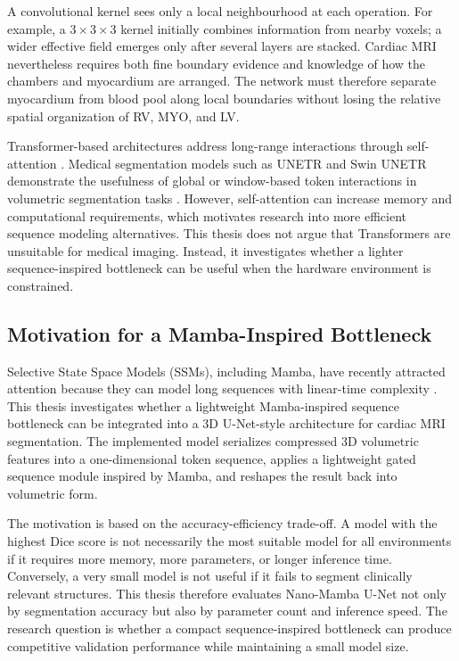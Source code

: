 A convolutional kernel sees only a local neighbourhood at each operation. For example, a $3\times3\times3$ kernel initially combines information from nearby voxels; a wider effective field emerges only after several layers are stacked. Cardiac MRI nevertheless requires both fine boundary evidence and knowledge of how the chambers and myocardium are arranged. The network must therefore separate myocardium from blood pool along local boundaries without losing the relative spatial organization of RV, MYO, and LV.

Transformer-based architectures address long-range interactions through self-attention \citep{vaswani2017attention,dosovitskiy2020image}. Medical segmentation models such as UNETR and Swin UNETR demonstrate the usefulness of global or window-based token interactions in volumetric segmentation tasks \citep{hatamizadeh2022unetr,hatamizadeh2022swin}. However, self-attention can increase memory and computational requirements, which motivates research into more efficient sequence modeling alternatives. This thesis does not argue that Transformers are unsuitable for medical imaging. Instead, it investigates whether a lighter sequence-inspired bottleneck can be useful when the hardware environment is constrained.

\subsection{Motivation for a Mamba-Inspired Bottleneck}
Selective State Space Models (SSMs), including Mamba, have recently attracted attention because they can model long sequences with linear-time complexity \citep{gu2023mamba}. This thesis investigates whether a lightweight Mamba-inspired sequence bottleneck can be integrated into a 3D U-Net-style architecture for cardiac MRI segmentation. The implemented model serializes compressed 3D volumetric features into a one-dimensional token sequence, applies a lightweight gated sequence module inspired by Mamba, and reshapes the result back into volumetric form.

The motivation is based on the accuracy-efficiency trade-off. A model with the highest Dice score is not necessarily the most suitable model for all environments if it requires more memory, more parameters, or longer inference time. Conversely, a very small model is not useful if it fails to segment clinically relevant structures. This thesis therefore evaluates Nano-Mamba U-Net not only by segmentation accuracy but also by parameter count and inference speed. The research question is whether a compact sequence-inspired bottleneck can produce competitive validation performance while maintaining a small model size.

